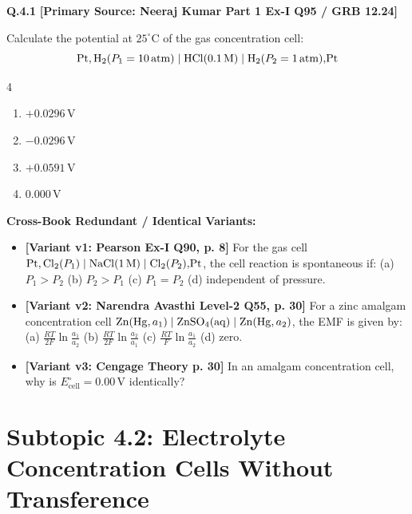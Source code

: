 \begin{problembox}
\textbf{Q.4.1} \hfill \textbf{[Primary Source: Neeraj Kumar Part 1 Ex-I Q95 / GRB  12.24]}
\label{q:qb-c4-01}

Calculate the potential at $25^\circ\text{C}$ of the gas concentration cell:
\begin{equation*}
    \ce{Pt, H2}(P_1 = 10\,\text{atm}) \mid \ce{HCl}(0.1\,\text{M}) \mid \ce{H2}(P_2 = 1\,\text{atm})\ce{, Pt}
\end{equation*}
\begin{multicols}{4}
\begin{enumerate}[label=(\alph*)]
    \item $+0.0296\,\text{V}$
    \item $-0.0296\,\text{V}$
    \item $+0.0591\,\text{V}$
    \item $0.000\,\text{V}$
\end{enumerate}
\end{multicols}

\tcbline
\textbf{\color{accentamber}Cross-Book Redundant / Identical Variants:}
\begin{itemize}[leftmargin=*,itemsep=2pt]
    \item \textbf{[Variant v1: Pearson Ex-I Q90, p. 8]} For the gas cell $\ce{Pt, Cl2}(P_1) \mid \ce{NaCl}(1\,\text{M}) \mid \ce{Cl2}(P_2)\ce{, Pt}$, the cell reaction is spontaneous if: (a) $P_1 > P_2$ (b) $P_2 > P_1$ (c) $P_1 = P_2$ (d) independent of pressure.
    \item \textbf{[Variant v2: Narendra Avasthi Level-2 Q55, p. 30]} For a zinc amalgam concentration cell $\ce{Zn(Hg, } a_1\ce{)} \mid \ce{ZnSO4(aq)} \mid \ce{Zn(Hg, } a_2\ce{)}$, the EMF is given by: (a) $\frac{RT}{2F}\ln \frac{a_1}{a_2}$ (b) $\frac{RT}{2F}\ln \frac{a_2}{a_1}$ (c) $\frac{RT}{F}\ln \frac{a_1}{a_2}$ (d) zero.
    \item \textbf{[Variant v3: Cengage Theory p. 30]} In an amalgam concentration cell, why is $E^\circ_{\text{cell}} = 0.00\,\text{V}$ identically?
\end{itemize}
\end{problembox}

\section{Subtopic 4.2: Electrolyte Concentration Cells Without Transference}

